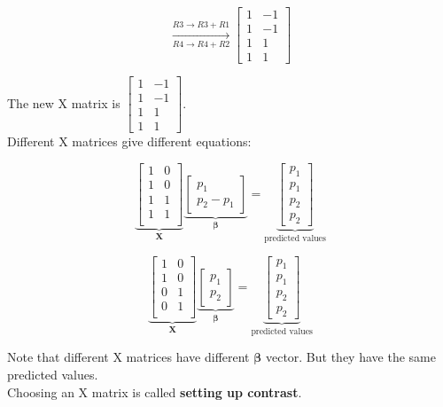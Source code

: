 \documentclass[12pt]{article}
\begin{document}
\begin{equation*}
\xrightarrow[\text{$R4 \rightarrow R4+R2$}]{\text{$R3 \rightarrow R3+R1$}}
\begin{bmatrix}
	1 & -1 \\
	1 & -1 \\
	1 & 1 \\
	1 & 1
\end{bmatrix}
\end{equation*}

The new X matrix is $\begin{bmatrix}
	1 & -1 \\
	1 & -1 \\
	1 & 1 \\
	1 & 1
\end{bmatrix}$. \\

Different X matrices give different equations: 

\[
\underbrace{
\begin{bmatrix}
	1 & 0 \\
	1 & 0 \\
   1 & 1 \\
   1 & 1 \\
\end{bmatrix}
}_\text{$\boldsymbol{X}$}
\underbrace{
\begin{bmatrix}
	p_1 \\
 	p_2 - p_1
\end{bmatrix}
}_\text{$\boldsymbol{\beta}$}
= 
\underbrace{
\begin{bmatrix}
	p_1 \\
	p_1 \\
	p_2 \\
   p_2
\end{bmatrix}
}_\text{predicted values}
\]

\[
\underbrace{
\begin{bmatrix}
	1 & 0 \\
	1 & 0 \\
	0 & 1 \\
   0 & 1 \\
\end{bmatrix}
}_\text{$\boldsymbol{X}$}
\underbrace{
\begin{bmatrix}
	p_1 \\
	p_2
\end{bmatrix}
}_\text{$\boldsymbol{\beta}$}
= 
\underbrace{
\begin{bmatrix}
	p_1 \\
	p_1 \\
	p_2 \\
	p_2
\end{bmatrix}
}_\text{predicted values}
\]

Note that different X matrices have different $\boldsymbol{\beta}$ vector. But they have the same predicted values.\\


Choosing an X matrix is called \textbf{setting up contrast}.
\end{document}
